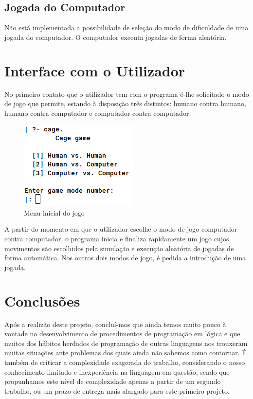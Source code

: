 \documentclass[a4paper]{article}
\begin{document}
\subsection{Jogada do Computador}
Não está implementada a possibilidade de seleção do modo de dificuldade de uma jogada do computador. O computador executa jogadas de forma aleatória.


\section{Interface com o Utilizador}

No primeiro contato que o utilizador tem com o programa é-lhe solicitado o modo de jogo que permite, estando à disposição três distintos: humano contra humano, humano contra computador e computador contra computador.

\begin{figure}[H]
    \center
    \includegraphics[scale=0.6]{resources/main-menu.png}
    \caption{Menu inicial do jogo}
    \label{fig:main-menu.png}
\end{figure}

A partir do momento em que o utilizador escolhe o modo de jogo computador contra computador, o programa inicia e finaliza rapidamente um jogo cujos movimentos são escolhidos pela simulação e execução aleatória de jogadas de forma automática. Nos outros dois modos de jogo, é pedida a introdução de uma jogada. 


\section{Conclusões}
Após a realizão deste projeto, concluí-mos que ainda temos muito pouco à vontade no desenvolvimento de procedimentos de programação em lógica e que muitos dos hábitos herdados de programação de outras linguagens nos trouxeram muitas situações ante problemas dos quais ainda não sabemos como contornar. É também de criticar a complexidade exagerada do trabalho, considerando o nosso conhecimento limitado e inexperiência na linguagem em questão, sendo que propunhamos este nível de complexidade apenas a partir de um segundo trabalho, ou um prazo de entrega mais alargado para este primeiro projeto.
\end{document}
